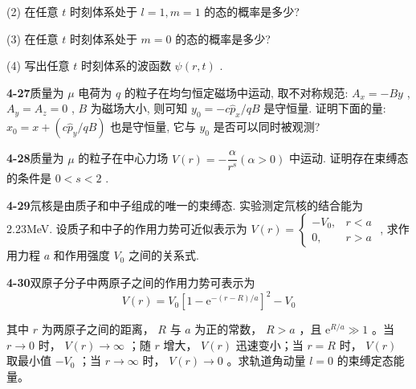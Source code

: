(2) 在任意 $\displaystyle t$ 时刻体系处于 $\displaystyle l = 1, m = 1$ 的态的概率是多少?

(3) 在任意 $\displaystyle t$ 时刻体系处于 $\displaystyle m = 0$ 的态的概率是多少?

(4) 写出任意 $\displaystyle t$ 时刻体系的波函数 $\displaystyle \psi(r, t)$ .

\vfill

\newpage

\textbf{4-27}\quad 质量为 $\displaystyle \mu$ 电荷为 $\displaystyle q$ 的粒子在均匀恒定磁场中运动, 取不对称规范: $\displaystyle A_x = -By$ , $\displaystyle A_y = A_z = 0$ , $\displaystyle B$ 为磁场大小, 则可知 $\displaystyle y_0 = -c\hat{p}_x / qB$ 是守恒量. 证明下面的量: $\displaystyle x_0 = x + (c\hat{p}_y / qB)$ 也是守恒量, 它与 $\displaystyle y_0$ 是否可以同时被观测?

\vfill

\newpage

\textbf{4-28}\quad 质量为 $\displaystyle \mu$ 的粒子在中心力场 $\displaystyle V(r) = -\dfrac{\alpha}{r^s} (\alpha > 0)$ 中运动. 证明存在束缚态的条件是 $\displaystyle 0 < s < 2$ .

\vfill

\newpage

\textbf{4-29}\quad 氘核是由质子和中子组成的唯一的束缚态. 实验测定氘核的结合能为 2.23MeV. 设质子和中子的作用力势可近似表示为 $\displaystyle V(r) = \begin{cases} -V_0, & r < a \\ 0, & r > a \end{cases}$ , 求作用力程 $\displaystyle a$ 和作用强度 $\displaystyle V_0$ 之间的关系式.

\vfill

\newpage

\textbf{4-30}\quad 双原子分子中两原子之间的作用力势可表示为
$$
V (r) = V _ {0} \left[ 1 - \mathrm{e} ^ {- (r - R) / a} \right] ^ {2} - V _ {0}
$$

其中 $\displaystyle r$ 为两原子之间的距离， $\displaystyle R$ 与 $\displaystyle a$ 为正的常数， $\displaystyle R > a$ ，且 $\displaystyle \mathrm{e}^{R / a} \gg 1$ 。当 $\displaystyle r \to 0$ 时， $\displaystyle V(r) \to \infty$ ；随 $\displaystyle r$ 增大， $\displaystyle V(r)$ 迅速变小；当 $\displaystyle r = R$ 时， $\displaystyle V(r)$ 取最小值 $\displaystyle -V_0$ ；当 $\displaystyle r \to \infty$ 时， $\displaystyle V(r) \to 0$ 。求轨道角动量 $\displaystyle l = 0$ 的束缚定态能量。

\vfill

